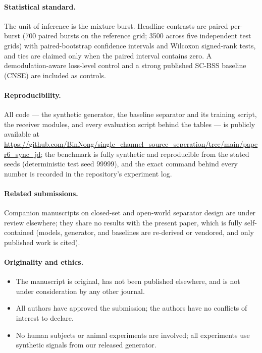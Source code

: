 \documentclass[11pt,a4paper]{article}
\begin{document}
\paragraph{Statistical standard.}
The unit of inference is the mixture burst. Headline contrasts are paired
per-burst (700 paired bursts on the reference grid; 3500 across five
independent test grids) with paired-bootstrap confidence intervals and
Wilcoxon signed-rank tests, and ties are claimed only when the paired
interval contains zero. A demodulation-aware loss-level control and a
strong published SC-BSS baseline (CNSE) are included as controls.

\paragraph{Reproducibility.}
All code --- the synthetic generator, the baseline separator and its
training script, the receiver modules, and every evaluation script behind
the tables --- is publicly available at
\url{https://github.com/BinNong/single_channel_source_seperation/tree/main/paper6_sync_jd};
the benchmark is fully synthetic and reproducible from the stated seeds
(deterministic test seed 99999), and the exact command behind every
number is recorded in the repository's experiment log.

\paragraph{Related submissions.}
Companion manuscripts on closed-set and open-world separator design are
under review elsewhere; they share no results with the present paper,
which is fully self-contained (models, generator, and baselines are
re-derived or vendored, and only published work is cited).

\paragraph{Originality and ethics.}
\begin{itemize}
\item The manuscript is original, has not been published elsewhere, and
is not under consideration by any other journal.
\item All authors have approved the submission; the authors have no
conflicts of interest to declare.
\item No human subjects or animal experiments are involved; all
experiments use synthetic signals from our released generator.
\end{itemize}
\end{document}
